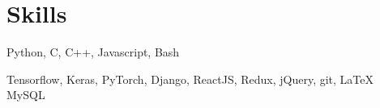 
\section{Skills}
Python, C, C++, Javascript, Bash
\sectionsep

Tensorflow, Keras, PyTorch, Django, ReactJS, Redux, jQuery, git, \LaTeX\, MySQL
\sectionsep